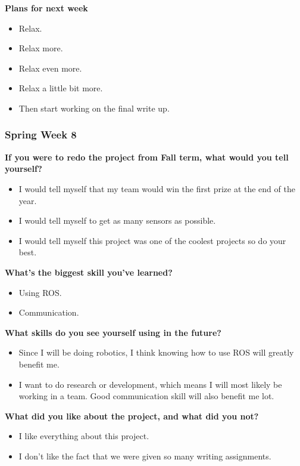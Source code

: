 \documentclass[compsoc,draftclsnofoot,onecolumn,10pt]{IEEEtran}
\begin{document}
\textbf{Plans for next week}
\begin{itemize}
  \item Relax.
  \item Relax more.
  \item Relax even more.
  \item Relax a little bit more.
  \item Then start working on the final write up.
\end{itemize}


\subsubsection*{Spring Week 8}

\textbf{If you were to redo the project from Fall term, what would you tell yourself?}
\begin{itemize}
  \item I would tell myself that my team would win the first prize at the end of the year.
  \item I would tell myself to get as many sensors as possible.
  \item I would tell myself this project was one of the coolest projects so do your best.
\end{itemize}

\textbf{What's the biggest skill you've learned?}
\begin{itemize}
  \item Using ROS.
  \item Communication.
\end{itemize}

\textbf{What skills do you see yourself using in the future?}
\begin{itemize}
  \item Since I will be doing robotics, I think knowing how to use ROS will greatly benefit me.
  \item I want to do research or development, which means I will most likely be working in a
  team. Good communication skill will also benefit me lot.
\end{itemize}

\textbf{What did you like about the project, and what did you not?}
\begin{itemize}
  \item I like everything about this project.
  \item I don't like the fact that we were given so many writing assignments.
\end{itemize}
\end{document}
